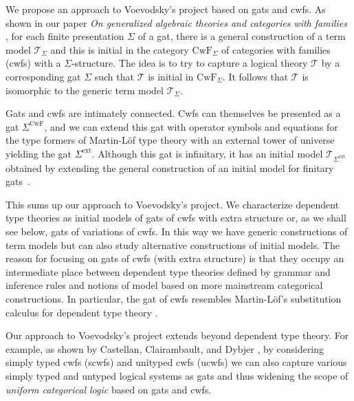 \documentclass[11pt,a4paper]{article}
\theoremstyle{plain}
\theoremstyle{definition}
\newcommand{\T}{\mathsf{T}}
\def\T{\mathcal{T}}
\def\CwF{\mathrm{CwF}}
\def\Sigmaext{{\Sigma^\mathrm{ext}}}
\def\Sigmaint{{\Sigma^\mathrm{up}}}
\def\TText{{\mathbf{TT}^\mathrm{ext}}}
\def\TTint{{\mathbf{TT}^\mathrm{up}}}
\begin{document}
We propose an approach to Voevodsky's project based on gats and cwfs. As shown in our paper {\em On generalized algebraic theories and categories with families} \cite{bezem:hofmann}, for each finite presentation $\Sigma$ of a gat, there is a general construction of a term model $\T_\Sigma$ and this is initial in the category $\CwF_\Sigma$ of categories with families (cwfs) \cite{dybjer:torino} with a $\Sigma$-structure. The idea is to try to capture a logical theory $\T$ by a corresponding gat $\Sigma$ such that $\T$  is initial in $\CwF_\Sigma$. It follows that $\T$ is isomorphic to the generic term model $\T_\Sigma$.

Gats and cwfs are intimately connected. Cwfs can themselves be presented as a gat $\Sigma^\CwF$, and we can extend this gat with operator symbols and equations for the type formers of Martin-Löf type theory with an external tower of universe yielding the gat $\Sigmaext$. Although this gat is infinitary, it has an initial model $\T_{\Sigmaext}$  obtained by extending the general construction of an initial model for finitary gats~\cite[Section 5.7]{bezem:hofmann}.

This sums up our approach to Voevodsky's project. We characterize dependent type theories as initial models of gats of cwfs with extra structure or, as we shall see below, gats of variations of cwfs. In this way we have generic constructions of term models but can also study alternative constructions of initial models. The reason for focusing on gats of cwfs (with extra structure) is that they occupy an intermediate place between dependent type theories defined by grammar and inference rules and notions of model based on more mainstream categorical constructions. In particular, the gat of cwfs resembles Martin-Löf's substitution calculus for dependent type theory \cite{martinlof:gbg92,tasistro:lic}.

Our approach to Voevodsky's project extends beyond dependent type theory. For example, as shown by Castellan, Clairambault, and Dybjer \cite{castellan:lambek}, by considering simply typed cwfs (scwfs) and unityped cwfs (ucwfs) we can also capture various simply typed and untyped logical systems as gats and thus widening the scope of {\em uniform categorical logic} based on gats and cwfs.

\end{document}
